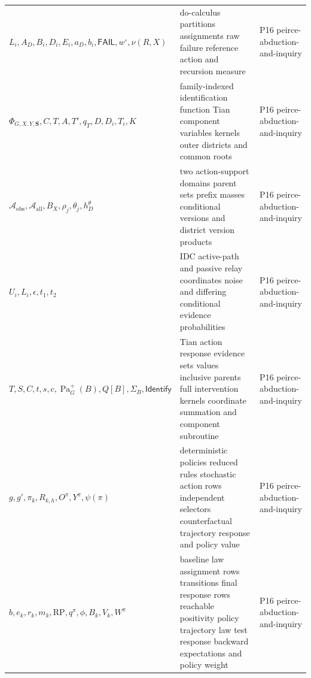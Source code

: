 \begin{longtable}{@{}p{}p{}p{}@{}}
\(L_i,\allowbreak A_D,\allowbreak B_i,\allowbreak D_i,\allowbreak E_i,\allowbreak a_D,\allowbreak b_i,\allowbreak \mathsf{FAIL},\allowbreak w^\circ,\allowbreak \nu(R,\allowbreak X)\) & do-calculus partitions assignments raw failure reference action and recursion measure & P16 peirce-\allowbreak{}abduction-\allowbreak{}and-\allowbreak{}inquiry \\
\(\Phi_{G,X,Y,\mathbf S},\allowbreak C,\allowbreak T,\allowbreak A,\allowbreak T',\allowbreak q_T,\allowbreak D,\allowbreak D_i,\allowbreak T_i,\allowbreak K\) & family-indexed identification function Tian component variables kernels outer districts and common roots & P16 peirce-\allowbreak{}abduction-\allowbreak{}and-\allowbreak{}inquiry \\
\(\mathcal A_{\mathrm{obs}},\allowbreak \mathcal A_{\mathrm{all}},\allowbreak B_X,\allowbreak \rho_j,\allowbreak \theta_j,\allowbreak h_D^\theta\) & two action-support domains parent sets prefix masses conditional versions and district version products & P16 peirce-\allowbreak{}abduction-\allowbreak{}and-\allowbreak{}inquiry \\
\(U_i,\allowbreak L_i,\allowbreak \epsilon,\allowbreak t_1,\allowbreak t_2\) & IDC active-path and passive relay coordinates noise and differing conditional evidence probabilities & P16 peirce-\allowbreak{}abduction-\allowbreak{}and-\allowbreak{}inquiry \\
\(T,\allowbreak S,\allowbreak C,\allowbreak t,\allowbreak s,\allowbreak c,\allowbreak \operatorname{Pa}^{+}_G(B),\allowbreak Q[B],\allowbreak \Sigma_B,\allowbreak \mathsf{Identify}\) & Tian action response evidence sets values inclusive parents full intervention kernels coordinate summation and component subroutine & P16 peirce-\allowbreak{}abduction-\allowbreak{}and-\allowbreak{}inquiry \\
\(g,\allowbreak g',\allowbreak \pi_k,\allowbreak R_{k,h},\allowbreak O^\pi,\allowbreak Y^\pi,\allowbreak \psi(\pi)\) & deterministic policies reduced rules stochastic action rows independent selectors counterfactual trajectory response and policy value & P16 peirce-\allowbreak{}abduction-\allowbreak{}and-\allowbreak{}inquiry \\
\(b,\allowbreak e_k,\allowbreak r_k,\allowbreak m_k,\allowbreak \mathrm{RP},\allowbreak q^\pi,\allowbreak \phi,\allowbreak B_k,\allowbreak V_k,\allowbreak W^\pi\) & baseline law assignment rows transitions final response rows reachable positivity policy trajectory law test response backward expectations and policy weight & P16 peirce-\allowbreak{}abduction-\allowbreak{}and-\allowbreak{}inquiry \\

\end{longtable}
